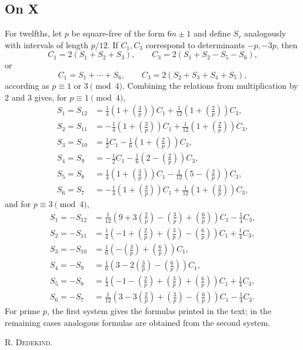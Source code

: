 \documentclass[12pt]{article}
\begin{document}
\subsection*{On X}

For twelfths, let \(p\) be square-free of the form \(6n\pm1\) and define \(S_r\) analogously with intervals of length \(p/12\). If \(C_1,C_3\) correspond to determinants \(-p,-3p\), then
\[
C_1=2(S_1+S_2+S_3),\qquad C_3=2(S_1+S_2-S_5-S_6),
\]
or
\[
C_1=S_1+\cdots+S_6,\qquad C_3=2(S_2+S_3+S_4+S_5),
\]
according as \(p\equiv1\) or \(3\pmod4\). Combining the relations from multiplication by \(2\) and \(3\) gives, for \(p\equiv1\pmod4\),
\[
\begin{aligned}
S_1=S_{12}&=\frac14\left(1+\left(\frac3p\right)\right)C_1+\frac1{12}\left(1+\left(\frac2p\right)\right)C_3,\\
S_2=S_{11}&=-\frac14\left(1+\left(\frac3p\right)\right)C_1+\frac1{12}\left(1+\left(\frac2p\right)\right)C_3,\\
S_3=S_{10}&=\frac12C_1-\frac16\left(1+\left(\frac2p\right)\right)C_3,\\
S_4=S_9&=-\frac12C_1-\frac16\left(2-\left(\frac2p\right)\right)C_3,\\
S_5=S_8&=\frac14\left(1+\left(\frac3p\right)\right)C_1-\frac1{12}\left(5-\left(\frac2p\right)\right)C_3,\\
S_6=S_7&=-\frac14\left(1+\left(\frac3p\right)\right)C_1+\frac1{12}\left(1+\left(\frac2p\right)\right)C_3,
\end{aligned}
\]
and for \(p\equiv3\pmod4\),
\[
\begin{aligned}
S_1=-S_{12}&=\frac1{12}\left(9+3\left(\frac2p\right)-\left(\frac3p\right)+\left(\frac6p\right)\right)C_1-\frac14C_3,\\
S_2=-S_{11}&=\frac14\left(-1+\left(\frac2p\right)+\left(\frac3p\right)-\left(\frac6p\right)\right)C_1+\frac14C_3,\\
S_3=-S_{10}&=\frac16\left(-\left(\frac3p\right)+\left(\frac6p\right)\right)C_1,\\
S_4=-S_9&=\frac16\left(3-2\left(\frac3p\right)-\left(\frac6p\right)\right)C_1,\\
S_5=-S_8&=\frac14\left(-1-\left(\frac2p\right)+\left(\frac3p\right)+\left(\frac6p\right)\right)C_1+\frac14C_3,\\
S_6=-S_7&=\frac1{12}\left(3-3\left(\frac2p\right)+\left(\frac3p\right)-\left(\frac6p\right)\right)C_1-\frac14C_3.
\end{aligned}
\]
For prime \(p\), the first system gives the formulas printed in the text; in the remaining cases analogous formulas are obtained from the second system.

\begin{flushright}
R. \textsc{Dedekind}.
\end{flushright}
\end{document}
